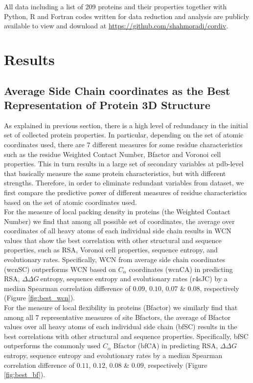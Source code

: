 \documentclass[11pt]{article}
\newcommand{\ddg}{$\Delta\Delta G~$}
\begin{document}
    All data including a list of 209 proteins and their properties together with Python, R and Fortran codes written for data reduction and analysis are publicly available to view and download at \url{https://github.com/shahmoradi/cordiv}.


\section{Results}
\label{sec:results}

    \subsection*{Average Side Chain coordinates as the Best Representation of Protein 3D Structure}

        As explained in previous section, there is a high level of redundancy in the initial set of collected protein properties. In particular, depending on the set of atomic coordinates used, there are $7$ different measures for some residue characteristics such as the residue Weighted Contact Number, Bfactor and Voronoi cell properties. This in turn results in a large set of secondary variables at pdb-level that basically measure the same protein characteristics, but with different strengths.  Therefore, in order to eliminate redundant variables from dataset, we first compare the predictive power of different measures of residue characteristics based on the set of atomic coordinates used.
        \\

        For the measure of local packing density in proteins (the Weighted Contact Number) we find that among all possible set of coordinates, the average over coordinates of all heavy atoms of each individual side chain results in WCN values that show the best correlation with other structural and sequence properties, such as RSA, Voronoi cell properties, sequence entropy, and evolutionary rates. Specifically, WCN from average side chain coordinates (wcnSC) outperforms WCN based on $C_\alpha$ coordinates (wcnCA) in predicting RSA, \ddg entropy, sequence entropy and evolutionary rates (r4sJC) by a median Spearman correlation difference of $0.09$, $0.10$, $0.07$ \& $0.08$, respectively (Figure \ref{fig:best_wcn}).
        \\

        For the measure of local flexibility in proteins (Bfactor) we similarly find that among all $7$ representative measures of site Bfactors, the average of Bfactor values over all heavy atoms of each individual side chain (bfSC) results in the best correlations with other structural and sequence properties. Specifically, bfSC outperforms the commonly used $C_\alpha$ Bfactor (bfCA) in predicting RSA, \ddg entropy, sequence entropy and evolutionary rates by a median Spearman correlation difference of $0.11$, $0.12$, $0.08$ \& $0.09$, respectively (Figure \ref{fig:best_bf}).
        \\
\end{document}
